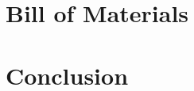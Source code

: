 \documentclass[11pt]{ieeeconf}
\begin{document}
\section{Bill of Materials}

\section{Conclusion}


%
\end{document}
